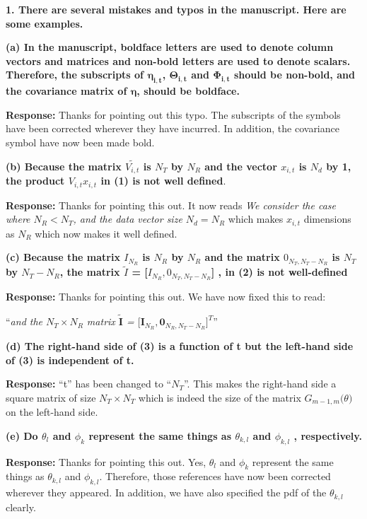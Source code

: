 \documentclass[12pt]{letter}
\begin{document}
\textbf{1. There are several mistakes and typos in the manuscript. Here are some examples.}

\textbf{(a) In the manuscript, boldface letters are used to denote column vectors and matrices and non-bold letters are used to denote scalars. Therefore, the subscripts of $\boldsymbol{\eta_{i,t}}$, $\boldsymbol{\Theta_{i,t}}$ and $\boldsymbol{\Phi_{i,t}}$ should be non-bold, and the covariance matrix of $\boldsymbol{\eta}$, should be boldface.}

\textbf{Response:} Thanks for pointing out this typo. The subscripts
of the symbols have been corrected wherever they have incurred. In addition,
the covariance symbol have now been made bold.

\textbf{(b) Because the matrix $\tilde{V_{i,t}}$ is $N_T$ by $N_R$ and
  the vector $x_{i,t}$ is $N_d$ by 1, the product $V_{i,t}x_{i,t}$ in
  (1) is not well defined}.

\textbf{Response:} Thanks for pointing this out.  It now reads
\emph{We consider the case where $N_R < N_T$, and the data vector size
  $N_d = N_R$} which makes $x_{i,t}$ dimensions as $N_R$ which now
makes it well defined.

\textbf{(c) Because the matrix $I_{N_R}$ is $N_R$ by $N_R$ and the
  matrix $0_{N_T , N_T - N_R }$ is $N_T$ by $N_T - N_R$, the matrix
  $\tilde{I}$ = [$I_{N_R}, 0_{N_T, N_T - N_R }$] , in (2) is not
  well-defined}

\textbf{Response:} Thanks for pointing this out.  We have now fixed
this to read:

``\emph{and the $N_T \times N_R$ matrix
  $\tilde{\textbf{I}}$ =
  $\big[\textbf{I}_{N_R }, {\boldsymbol{0}}_{N_R ,N_T
    -N_R}\big]^{T}$}''

\textbf{(d) The right-hand side of (3) is a function of t but the left-hand side of (3) is independent of t.}

\textbf{Response:} ``t'' has been changed to ``$N_T$''. This makes the
right-hand side a square matrix of size $N_T \times N_T$ which is
indeed the size of the matrix $G_{m-1,m}\big(\theta\big)$ on the
left-hand side.

\textbf{(e) Do $\theta_l$ and $\phi_k$ represent the same things as $\theta_{k,l}$ and $\phi_{k,l}$ , respectively.}

\textbf{Response:} Thanks for pointing this out. Yes, $\theta_l$ and
$\phi_k$ represent the same things as $\theta_{k,l}$ and
$\phi_{k,l}$. Therefore, those references have now been corrected
wherever they appeared. In addition, we have also specified the pdf of
the $\theta_{k,l}$ clearly.
\end{document}

